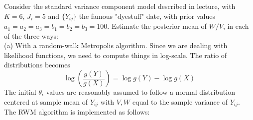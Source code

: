 
Consider the standard variance component model described in lecture, with $K=6$, $J_i=5$ and $\{Y_{ij}\}$ the famous "dyestuff" date, with prior values $a_1=a_2=a_3=b_1=b_2=b_3=100$. Estimate the posterior mean of $W/V$, in each of the three ways:\\
(a) With a random-walk Metropolis algorithm.
Since we are dealing with likelihood functions, we need to compute things in log-scale. The ratio of distributions becomes $$\log\left(\frac{g(Y)}{g(X)}\right) = \log g(Y)-\log g(X)$$
The initial $\theta_i$ values are reasonably assumed to follow a normal distribution centered at sample mean of $Y_{ij}$ with $V,W$ equal to the sample variance of $Y_{ij}$. \\
The RWM algorithm is implemented as follows:
\begin{knitrout}
\color{fgcolor}\begin{kframe}
\begin{alltt}
\hlkwb{=}
\hlkwb{=}
\hlkwb{=}

\hlkwb{=}
\hlkwb{=}
 \hlkwb{=} 

 \hlkwb{=} \hlstd{(} \hlstd{(}
  \hlstd{(}\hlstd{,} \hlstd{,} \hlstd{,} \hlstd{,} \hlstd{,}
    \hlstd{,} \hlstd{,} \hlstd{,} \hlstd{,} \hlstd{,}
    \hlstd{,} \hlstd{,} \hlstd{,} \hlstd{,} \hlstd{,}
    \hlstd{,} \hlstd{,} \hlstd{,} \hlstd{,} \hlstd{,}
    \hlstd{,} \hlstd{,} \hlstd{,} \hlstd{,} \hlstd{,}
    \hlstd{,} \hlstd{,} \hlstd{,} \hlstd{,} \hlstd{),} \hlstd{=}\hlstd{) )}


\end{alltt}
\end{kframe}
\end{knitrout}
